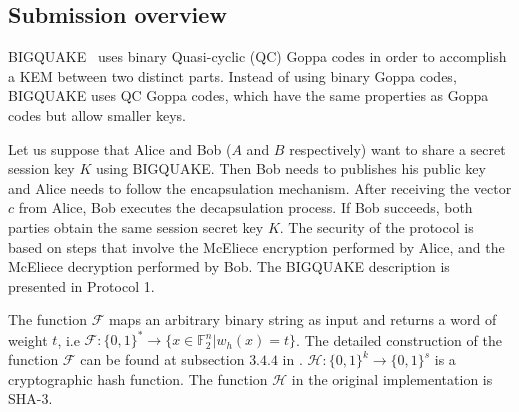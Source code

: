\label{sec:attack}
\subsection{Submission overview}
BIGQUAKE~\cite{bardet2017big} uses binary Quasi-cyclic (QC) Goppa codes in order to accomplish a KEM between two distinct parts. Instead of using binary Goppa codes, BIGQUAKE uses QC Goppa codes, which have the same properties as Goppa codes but allow smaller keys.

Let us suppose that Alice and Bob ($A$ and $B$ respectively) want to share a secret session key $K$ using BIGQUAKE. Then Bob needs to publishes his public key and Alice needs to follow the encapsulation mechanism. After receiving the vector $c$ from Alice, Bob executes the decapsulation process. If Bob succeeds, both parties obtain the same session secret key $K$. The security of the protocol is based on steps that involve the McEliece encryption performed by Alice, and the McEliece decryption performed by Bob. The BIGQUAKE description is presented in Protocol 1.

The function $\mathcal{F}$ maps an arbitrary binary string as input and returns a word of weight $t$, i.e $\mathcal{F}: \{0,1\}^* \to \{x \in \mathbb{F}^n_2 | w_h(x) = t\}$. The detailed construction of the function $\mathcal{F}$ can be found at subsection $3.4.4$ in \cite{bardet2017big}. $\mathcal{H} : \{0,1\}^k \to \{0,1\}^s$ is a cryptographic hash function. The function $\mathcal{H}$ in the original implementation is SHA-3. 


